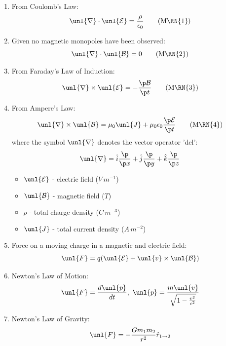 \documentclass[a4paper, 11pt, normalem]{report}
\renewcommand\E{\mathcal{E}}
\newcommand\uE{\unl{\E}}
\renewcommand\B{\mathcal{B}}
\newcommand\uB{\unl{\B}}
\renewcommand\del{\unl{\nabla}}
\newcommand\eno{\epsilon_0}
\newcommand\hi{\hat{i}}
\newcommand\hj{\hat{j}}
\newcommand\hk{\hat{k}}
\newcommand\J{\unl{J}}
\begin{document}
\begin{enumerate}
    \item From Coulomb's Law:
        \begin{equation}
            \del\cdot\uE = \frac{\rho}{\eno} \tag{M\RN{1}}
        \end{equation}
    \item Given no magnetic monopoles have been observed:
        \begin{equation}
            \del\cdot \uB = 0 \tag{M\RN{2}}
        \end{equation}
    \item From Faraday's Law of Induction:
        \begin{equation}
            \del \times \uE = -\frac{\p \B}{\p t} \tag{M\RN{3}}
        \end{equation}
    \item From Ampere's Law:
        \begin{equation}
            \del \times \uB = \mu_0 \J + \mu_0 \eno \frac{\p \E}{\p t} \tag{M\RN{4}}
        \end{equation}
        where the symbol $\del$ denotes the vector operator 'del':
        \begin{equation}
            \del = \hi \frac{\p}{\p x} + \hj \frac{\p}{\p y} + \hk \frac{\p}{\p z}
        \end{equation}
        \begin{itemize}
            \item $\uE$ - electric field ($V\,m^{-1}$)
            \item $\uB$ - magnetic field ($T$)
            \item $\rho$ - total charge density ($C\,m^{-3}$)
            \item $\J$ - total current density ($A\,m^{-2}$)
        \end{itemize}
    \item Force on a moving charge in a magnetic and electric field:
        \begin{equation}
            \unl{F} = q(\uE + \unl{v} \times \uB)
        \end{equation}
    \item Newton's Law of Motion:
        \begin{equation}
            \unl{F} = \frac{d\unl{p}}{dt}, ~ \unl{p} = \frac{m\unl{v}}{\sqrt{1 - \frac{v^2}{c^2}}}
        \end{equation}
    \item Newton's Law of Gravity:
        \begin{equation}
            \unl{F} = -\frac{Gm_1 m_2}{r^2}\hat{r}_{1 \to 2}
        \end{equation}
\end{enumerate}
\end{document}
